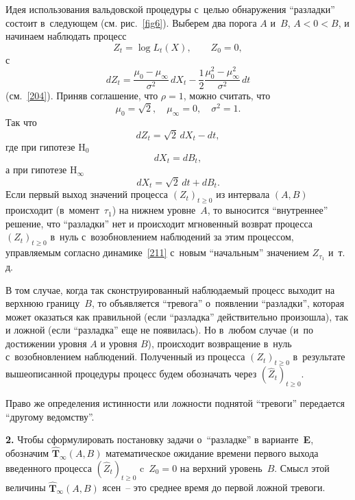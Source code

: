 Идея использования вальдовской процедуры с~целью обнаружения
``разладки'' состоит в~следующем (см. рис.~\ref{fig6}). Выберем
два порога $A$ и~$B$, $A<0<B$, и начинаем наблюдать процесс
\[
Z_t=\log L_t(X),\qquad Z_0=0,
\]
с
\begin{equation}
\label{211}%
dZ_t
=\frac{\mu_0-\mu_{\infty}}{\sigma^2}\,dX_t
-\frac12\frac{\mu_0^2-\mu_{\infty}^2}{\sigma^2}\,dt
\end{equation}
(см.~\eqref{204}). Приняв соглашение, что $\rho=1$, можно считать,
что
\[
\mu_0=\sqrt{2},\quad
\mu_{\infty}=0,\quad
\sigma^2=1.
\]
Так что
\begin{equation}
\label{212}%
dZ_t=\sqrt{2}\,dX_t-dt,
\end{equation}
где при гипотезе $\mathrm{H}_0$
\begin{equation}
\label{213}%
dX_t=dB_t,
\end{equation}
а при гипотезе $\mathrm{H}_\infty$
\begin{equation}
\label{214}%
dX_t=\sqrt{2}\,dt+dB_t.
\end{equation}
Если первый выход значений процесса $(Z_t)_{t\ge0}$ из интервала
$(A,B)$ происходит (в~момент~$\tau_1$) на нижнем уровне~$A$, то
выносится ``внутреннее'' решение, что ``разладки'' нет и
происходит мгновенный возврат процесса $(Z_t)_{t\ge0}$ в~нуль
с~возобновлением наблюдений за этим процессом, управляемым
согласно динамике~\eqref{211} с~новым ``начальным'' значением
$Z_{\tau_1}$ и~т.\,д.

В том случае, когда так сконструированный наблюдаемый процесс
выходит на  верхнюю границу~$B$, то объявляется ``тревога''
о~появлении ``разладки'', которая может оказаться как правильной
(если ``разладка'' действительно произошла), так и ложной (если
``разладка'' еще не появилась). Но в~любом случае (и~по достижении
уровня $A$ и уровня $B$), происходит возвращение в~нуль
с~возобновлением наблюдений. Полученный из процесса
$(Z_t)_{t\ge0}$ в~результате вышеописанной процедуры процесс будем
обозначать через $(\widehat{Z}_t)_{t\ge0}$.

Право же определения истинности или ложности поднятой ``тревоги''
передается ``другому ведомству''.

\textbf{2.} Чтобы сформулировать постановку задачи о~``разладке''
в варианте~\textbf{E}, обозначим
$\widehat{\mathbf{T}}_{\infty}(A,B)$ математическое ожидание
времени первого выхода введенного процесса
$(\widehat{Z}_t)_{t\ge0}$ c~$\widehat{Z}_0=0$ на верхний
уровень~$B$. Смысл этой величины
$\widehat{\mathbf{T}}_{\infty}(A,B)$ ясен~-- это среднее время до
первой ложной тревоги.

